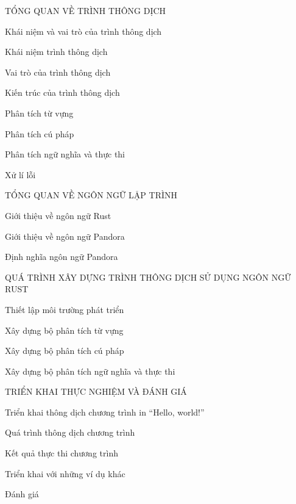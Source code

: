 \documentclass[11pt,a4paper]{article}
\begin{document}
    \begin{mucluc}
        \item TỔNG QUAN VỀ TRÌNH THÔNG DỊCH
        \begin{mucluc}
            \item Khái niệm và vai trò của trình thông dịch
            \begin{mucluc}
                \item Khái niệm trình thông dịch
                \item Vai trò của trình thông dịch
            \end{mucluc}
            \item Kiến trúc của trình thông dịch
            \begin{mucluc}
                \item Phân tích từ vựng
                \item Phân tích cú pháp
                \item Phân tích ngữ nghĩa và thực thi
                \item Xử lí lỗi
            \end{mucluc}
        \end{mucluc}
        \item TỔNG QUAN VỀ NGÔN NGỮ LẬP TRÌNH
        \begin{mucluc}
            \item Giới thiệu về ngôn ngữ Rust
            \item Giới thiệu về ngôn ngữ Pandora
            \item Định nghĩa ngôn ngữ Pandora
        \end{mucluc}
        \item QUÁ TRÌNH XÂY DỰNG TRÌNH THÔNG DỊCH SỬ DỤNG NGÔN NGỮ RUST
        \begin{mucluc}
            \item Thiết lập môi trường phát triển
            \item Xây dựng bộ phân tích từ vựng %
            \item Xây dựng bộ phân tích cú pháp %
            \item Xây dựng bộ phân tích ngữ nghĩa và thực thi %
        \end{mucluc}
        \item TRIỂN KHAI THỰC NGHIỆM VÀ ĐÁNH GIÁ
        \begin{mucluc}
            \item Triển khai thông dịch chương trình in “Hello, world!”
            \begin{mucluc}
                \item Quá trình thông dịch chương trình 
                \item Kết quả thực thi chương trình
            \end{mucluc}
            \item Triển khai với những ví dụ khác
            \item Đánh giá
        \end{mucluc}
    \end{mucluc}
\end{document}
